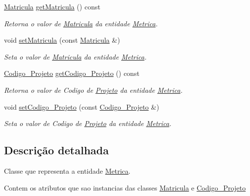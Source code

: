 \begin{DoxyCompactItemize}
\item 
\hyperlink{class_matricula}{\-Matricula} \hyperlink{class_metrica_aac1c9b4d9ce1e9f3f883364d335db398}{get\-Matricula} () const 
\begin{DoxyCompactList}\small\item\em \-Retorna o valor de \hyperlink{class_matricula}{\-Matricula} da entidade \hyperlink{class_metrica}{\-Metrica}. \end{DoxyCompactList}\item 
void \hyperlink{class_metrica_a487bdcdc0e4bf2b5cb2a59eeaee7e573}{set\-Matricula} (const \hyperlink{class_matricula}{\-Matricula} \&)
\begin{DoxyCompactList}\small\item\em \-Seta o valor de \hyperlink{class_matricula}{\-Matricula} da entidade \hyperlink{class_metrica}{\-Metrica}. \end{DoxyCompactList}\item 
\hyperlink{class_codigo___projeto}{\-Codigo\-\_\-\-Projeto} \hyperlink{class_metrica_a07b7984fa372dd071a76eac6b1e4f2ad}{get\-Codigo\-\_\-\-Projeto} () const 
\begin{DoxyCompactList}\small\item\em \-Retorna o valor de \-Codigo de \hyperlink{class_projeto}{\-Projeto} da entidade \hyperlink{class_metrica}{\-Metrica}. \end{DoxyCompactList}\item 
void \hyperlink{class_metrica_a882894975eb6e00d0d076ecb1309ee3f}{set\-Codigo\-\_\-\-Projeto} (const \hyperlink{class_codigo___projeto}{\-Codigo\-\_\-\-Projeto} \&)
\begin{DoxyCompactList}\small\item\em \-Seta o valor de \-Codigo de \hyperlink{class_projeto}{\-Projeto} da entidade \hyperlink{class_metrica}{\-Metrica}. \end{DoxyCompactList}\end{DoxyCompactItemize}


\subsection{\-Descrição detalhada}
\-Classe que representa a entidade \hyperlink{class_metrica}{\-Metrica}. 

\-Contem os atributos que sao instancias das classes \hyperlink{class_matricula}{\-Matricula} e \hyperlink{class_codigo___projeto}{\-Codigo\-\_\-\-Projeto} 

